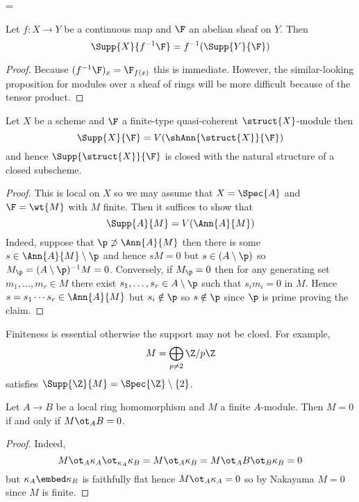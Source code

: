 =\documentclass[12pt]{article}
\begin{document}
\begin{prop}
Let $f : X \to Y$ be a continuous map and $\F$ an abelian sheaf on $Y$. Then
\[ \Supp{X}{f^{-1} \F} = f^{-1}(\Supp{Y}{\F}) \]
\end{prop}

\begin{proof}
Because $(f^{-1} \F)_x = \F_{f(x)}$ this is immediate. However, the similar-looking proposition for modules over a sheaf of rings will be more difficult because of the tensor product.
\end{proof}

\begin{prop}
Let $X$ be a scheme and $\F$ a finite-type quasi-coherent $\struct{X}$-module then
\[ \Supp{X}{\F} = V(\shAnn{\struct{X}}{\F}) \]
and hence $\Supp{\struct{X}}{\F}$ is closed with the natural structure of a closed subscheme.
\end{prop}

\begin{proof}
This is local on $X$ so we may assume that $X = \Spec{A}$ and $\F = \wt{M}$ with $M$ finite. Then it suffices to show that
\[ \Supp{A}{M} = V(\Ann{A}{M}) \]
Indeed, suppose that $\p \not\supset \Ann{A}{M}$ then there is some $s \in \Ann{A}{M} \setminus \p$ and hence $s M = 0$ but $s \in (A \setminus \p)$ so $M_\p = (A \setminus \p)^{-1} M = 0$. Conversely, if $M_\p = 0$ then for any generating set $m_1, \dots, m_r \in M$ there exist $s_1, \dots, s_r \in A \setminus \p$ such that $s_i m_i = 0$ in $M$. Hence $s = s_1 \cdots s_r \in \Ann{A}{M}$ but $s_i \notin \p$ so $s \notin \p$ since $\p$ is prime proving the claim.
\end{proof}

\begin{example}
Finiteness is essential otherwise the support may not be cloed. For example,
\[ M = \bigoplus_{p \neq 2} \Z / p \Z \]
satisfies $\Supp{\Z}{M} = \Spec{\Z} \setminus \{ 2 \}$.
\end{example}

\begin{prop}
Let $A \to B$ be a local ring homomorphism and $M$ a finite $A$-module. Then $M = 0$ if and only if $M \ot_A B = 0$.
\end{prop}

\begin{proof}
Indeed, 
\[ M \ot_A \kappa_A \ot_{\kappa_A} \kappa_B = M \ot_A \kappa_B = M \ot_A B \ot_B \kappa_B = 0 \]
but $\kappa_A \embed \kappa_B$ is faithfully flat hence $M \ot_A \kappa_A = 0$ so by Nakayama $M = 0$ since $M$ is finite.
\end{proof}
\end{document}
